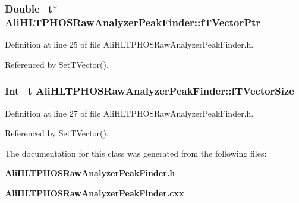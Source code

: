 \subsubsection{\setlength{\rightskip}{0pt plus 5cm}Double\_\-t$\ast$ {\bf Ali\-HLTPHOSRaw\-Analyzer\-Peak\-Finder::f\-TVector\-Ptr}\hspace{0.3cm}{\tt  [private]}}\label{classAliHLTPHOSRawAnalyzerPeakFinder_AliHLTPHOSRawAnalyzerPeakFinderr0}




Definition at line 25 of file Ali\-HLTPHOSRaw\-Analyzer\-Peak\-Finder.h.

Referenced by Set\-TVector().
\subsubsection{\setlength{\rightskip}{0pt plus 5cm}Int\_\-t {\bf Ali\-HLTPHOSRaw\-Analyzer\-Peak\-Finder::f\-TVector\-Size}\hspace{0.3cm}{\tt  [private]}}\label{classAliHLTPHOSRawAnalyzerPeakFinder_AliHLTPHOSRawAnalyzerPeakFinderr2}




Definition at line 27 of file Ali\-HLTPHOSRaw\-Analyzer\-Peak\-Finder.h.

Referenced by Set\-TVector().

The documentation for this class was generated from the following files:\begin{CompactItemize}
\item 
{\bf Ali\-HLTPHOSRaw\-Analyzer\-Peak\-Finder.h}\item 
{\bf Ali\-HLTPHOSRaw\-Analyzer\-Peak\-Finder.cxx}\end{CompactItemize}
